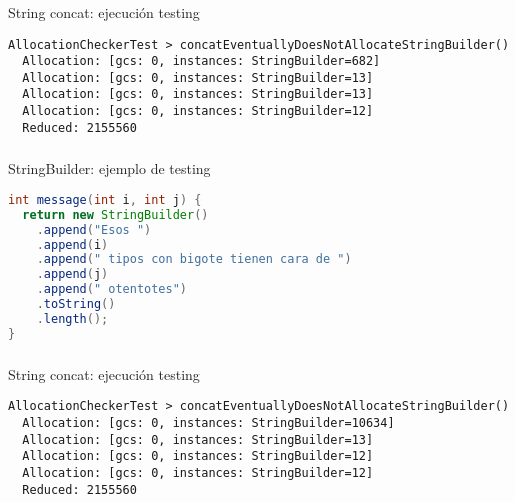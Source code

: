 \begin{frame}[fragile]
  \frametitle{\ft}
  \begin{block}{String concat: ejecución testing}
    \begin{lstlisting}
AllocationCheckerTest > concatEventuallyDoesNotAllocateStringBuilder()
  Allocation: [gcs: 0, instances: StringBuilder=682]
  Allocation: [gcs: 0, instances: StringBuilder=13]
  Allocation: [gcs: 0, instances: StringBuilder=13]
  Allocation: [gcs: 0, instances: StringBuilder=12]
  Reduced: 2155560
    \end{lstlisting}
  \end{block}
\end{frame}


\begin{frame}[fragile]
  \frametitle{\ft}
  \begin{block}{StringBuilder: ejemplo de testing}
    \begin{lstlisting}[language=java]
int message(int i, int j) {
  return new StringBuilder()
    .append("Esos ")
    .append(i)
    .append(" tipos con bigote tienen cara de ")
    .append(j)
    .append(" otentotes")
    .toString()
    .length();
}
    \end{lstlisting}
  \end{block}
\end{frame}

\begin{frame}[fragile]
  \frametitle{\ft}
  \begin{block}{String concat: ejecución testing}
    \begin{lstlisting}
AllocationCheckerTest > concatEventuallyDoesNotAllocateStringBuilder()
  Allocation: [gcs: 0, instances: StringBuilder=10634]
  Allocation: [gcs: 0, instances: StringBuilder=13]
  Allocation: [gcs: 0, instances: StringBuilder=12]
  Allocation: [gcs: 0, instances: StringBuilder=12]
  Reduced: 2155560
    \end{lstlisting}
  \end{block}
\end{frame}
